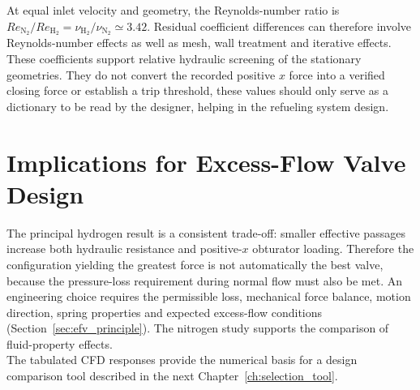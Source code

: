 At equal inlet velocity and geometry, the Reynolds-number ratio is $Re_{\mathrm{N}_2}/Re_{\mathrm{H}_2}=\nu_{\mathrm{H}_2}/\nu_{\mathrm{N}_2}\simeq3.42$. Residual coefficient differences can therefore involve Reynolds-number effects as well as mesh, wall treatment and iterative effects.\\

These coefficients support relative hydraulic screening of the stationary geometries. They do not convert the recorded positive $x$ force into a verified closing force or establish a trip threshold, these values should only serve as a dictionary to be read by the designer, helping in the refueling system design.

\section{Implications for Excess-Flow Valve Design}
\label{sec:results_efv_implications}

The principal hydrogen result is a consistent trade-off: smaller effective passages increase both hydraulic resistance and positive-$x$ obturator loading. Therefore the configuration yielding the greatest force is not automatically the best valve, because the pressure-loss requirement during normal flow must also be met. An engineering choice requires the permissible loss, mechanical force balance, motion direction, spring properties and expected excess-flow conditions (Section~\ref{sec:efv_principle}).
The nitrogen study supports the comparison of fluid-property effects.\\

The tabulated CFD responses provide the numerical basis for a design comparison tool described in the next Chapter~\ref{ch:selection_tool}.
\clearpage


